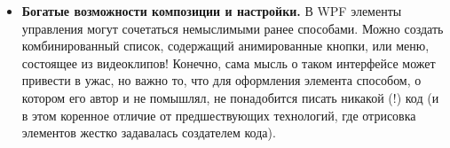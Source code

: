 \documentclass[a4paper,14pt]{extarticle}
\begin{document}
\begin{itemize}
    \item \textbf{Богатые возможности композиции и настройки.} В WPF элементы управления могут
    сочетаться немыслимыми ранее способами. Можно создать комбинированный список, содержащий
    анимированные кнопки, или меню, состоящее из видеоклипов! Конечно, сама мысль о таком интерфейсе
    может привести в ужас, но важно то, что для оформления элемента способом, о котором его автор
    и не помышлял, не понадобится писать никакой (!) код (и в этом коренное отличие от предшествующих
    технологий, где отрисовка элементов жестко задавалась создателем кода).
\end{itemize}
\end{document}

